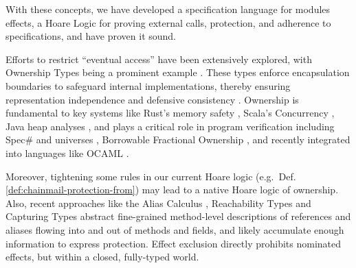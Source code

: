  With these concepts, we have developed a specification language for modules \taming effects, a Hoare Logic for proving external calls, protection, and adherence to specifications, and have proven it sound. %

   Efforts to restrict ``eventual access'' have been extensively explored, with
 Ownership Types  being a prominent example \cite{simpleOwnership,existOwn}.
These types enforce encapsulation boundaries to safeguard internal implementations, thereby ensuring representation independence and defensive consistency
\cite{ownalias,NobPotVitECOOP98,Banerjee:2005}.
Ownership is fundamental to key systems like Rust’s memory safety  
\cite{RustPL2,RustBelt18},
Scala's Concurrency \cite{ScalaCapabilities,ScalaLightweightAffine},
Java heap analyses \cite{PotterNC98,HillNP02,MitECOOP06}, 
and   plays a critical role in program verification
\cite{BoyLisShrPOPL03,hypervisor} including Spec$\#$
\cite{BarLeiSch05,BarDelFahLeiSch04} and universes
\cite{DieDroMue07,DietlMueller05,LuPotPOPL06},
Borrowable Fractional Ownership \cite{borrow-fract-vmcai2024},
and recently integrated into languages like OCAML \cite{ocaml-ownership-icfp2024,funk-ownership-oopsla2024}.


Moreover,  tightening some
rules in our current Hoare logic (e.g.\ Def. \ref{def:chainmail-protection-from})
may lead to a native  Hoare logic of ownership.
Also, recent approaches like
%
%
the Alias
Calculus \cite{meyer-alias-calculus-scp2015,meyer-auto-alias-sncs2020},
Reachability
Types \cite{romf-reachability-types-oopsla2021,rompf-poly-reachability-oopsla2024}
and Capturing
Types \cite{odersky-capturing-types-toplas2023,scoped-effects-oopsla2022,odersky-reach-prog2024}
abstract fine-grained method-level descriptions of 
references and aliases flowing into and out of methods and fields,
and likely accumulate enough information to express 
protection. Effect exclusion
\cite{fx-exclusion-icfp2023} directly prohibits nominated
effects, but within a closed, fully-typed world.



